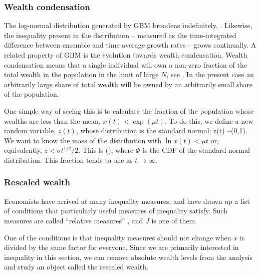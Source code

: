 
\subsubsection{Wealth condensation}
The log-normal distribution generated by GBM broadens indefinitely, . Likewise, the inequality present in the distribution -- measured as the time-integrated difference between ensemble and time average growth rates -- grows continually. A related property of GBM is the evolution towards wealth condensation. Wealth condensation means that a single individual will own a non-zero fraction of the total wealth in the population in the limit of large $N$, see \eg \cite{BouchaudMezard2000}. In the present case an arbitrarily large share of total wealth will be owned by an arbitrarily small share of the population.

One simple way of seeing this is to calculate the fraction of the population whose wealths are less than the mean, \ie $x(t)<\exp(\mu t)$. To do this, we define a new random variable, $z(t)$, whose distribution is the standard normal:
\be
z(t) \equiv {} \sim {}(0,1).
\ee
We want to know the mass of the distribution with $\ln x(t)<\mu t$ or, equivalently, $z<\sigma t^{1/2}/2$. This is
\be
\Phi\left(\right),
\ee
where $\Phi$ is the CDF of the standard normal distribution. This fraction tends to one as $t\to\infty$.


\subsubsection{Rescaled wealth}
Economists have arrived at many inequality measures, and have drawn up a list of conditions that particularly useful measures of inequality satisfy. Such measures are called ``relative measures'' \cite[Appendix 4]{Sen1997}, and $J$ is one of them.

One of the conditions is that inequality measures should not change when $x$ is divided by the same factor for everyone. Since we are primarily interested in inequality in this section, we can remove absolute wealth levels from the analysis and study an object called the rescaled wealth.


